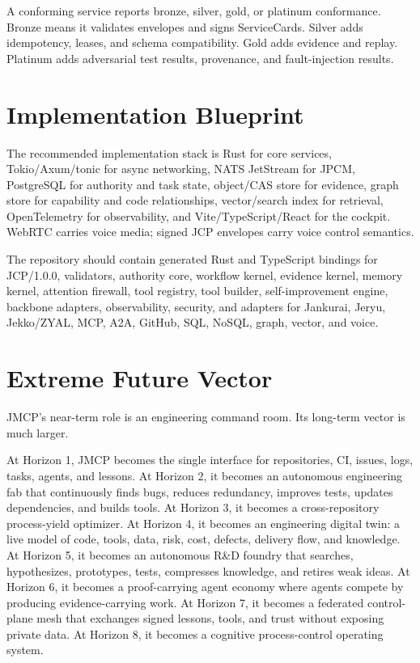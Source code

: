 \documentclass[12pt,journal,onecolumn,draftclsnofoot]{IEEEtran}
\begin{document}
A conforming service reports bronze, silver, gold, or platinum conformance. Bronze means it validates envelopes and signs ServiceCards. Silver adds idempotency, leases, and schema compatibility. Gold adds evidence and replay. Platinum adds adversarial test results, provenance, and fault-injection results.

\section{Implementation Blueprint}
The recommended implementation stack is Rust for core services, Tokio/Axum/tonic for async networking, NATS JetStream for JPCM, PostgreSQL for authority and task state, object/CAS store for evidence, graph store for capability and code relationships, vector/search index for retrieval, OpenTelemetry for observability, and Vite/TypeScript/React for the cockpit. WebRTC carries voice media; signed JCP envelopes carry voice control semantics.

The repository should contain generated Rust and TypeScript bindings for JCP/1.0.0, validators, authority core, workflow kernel, evidence kernel, memory kernel, attention firewall, tool registry, tool builder, self-improvement engine, backbone adapters, observability, security, and adapters for Jankurai, Jeryu, Jekko/ZYAL, MCP, A2A, GitHub, SQL, NoSQL, graph, vector, and voice.

\section{Extreme Future Vector}
JMCP's near-term role is an engineering command room. Its long-term vector is much larger.

At Horizon 1, JMCP becomes the single interface for repositories, CI, issues, logs, tasks, agents, and lessons. At Horizon 2, it becomes an autonomous engineering fab that continuously finds bugs, reduces redundancy, improves tests, updates dependencies, and builds tools. At Horizon 3, it becomes a cross-repository process-yield optimizer. At Horizon 4, it becomes an engineering digital twin: a live model of code, tools, data, risk, cost, defects, delivery flow, and knowledge. At Horizon 5, it becomes an autonomous R\&D foundry that searches, hypothesizes, prototypes, tests, compresses knowledge, and retires weak ideas. At Horizon 6, it becomes a proof-carrying agent economy where agents compete by producing evidence-carrying work. At Horizon 7, it becomes a federated control-plane mesh that exchanges signed lessons, tools, and trust without exposing private data. At Horizon 8, it becomes a cognitive process-control operating system.
\end{document}
